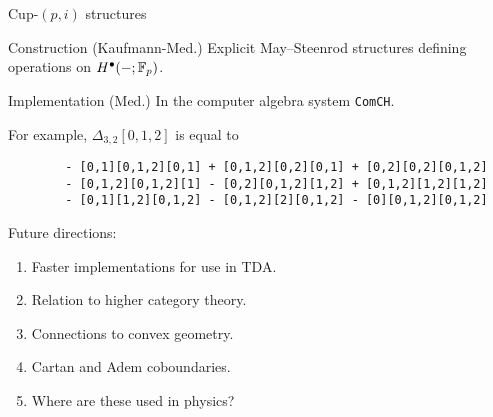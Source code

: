 \begin{frame}[fragile]{Cup-$(p,i)$ structures}

	\vskip-5pt\pause

	\begin{block}{Construction (Kaufmann-Med.)}
		Explicit May--Steenrod structures defining \textcolor{pblue}{operations} on $H^\bullet(-; {\mathbb{F}_p})$.
	\end{block}

	\pause

	\begin{block}{Implementation (Med.)}
		In the computer algebra system \verb|ComCH|.
	\end{block}

	\pause

	For example, $\Delta_{3,2}[0,1,2]$ is equal to

	\begin{verbatim}
		- [0,1][0,1,2][0,1] + [0,1,2][0,2][0,1] + [0,2][0,2][0,1,2]
		- [0,1,2][0,1,2][1] - [0,2][0,1,2][1,2] + [0,1,2][1,2][1,2]
		- [0,1][1,2][0,1,2] - [0,1,2][2][0,1,2] - [0][0,1,2][0,1,2]
	\end{verbatim}

	\pause

	\textcolor{pblue}{Future directions:}

	\pause
	\begin{enumerate}
		\item Faster implementations for use in TDA. \pause \\
		\item Relation to higher category theory. \pause \\
		\item Connections to convex geometry. \pause \\
		\item Cartan and Adem coboundaries. \pause \\
		\item Where are these used in physics?
	\end{enumerate}
\end{frame}